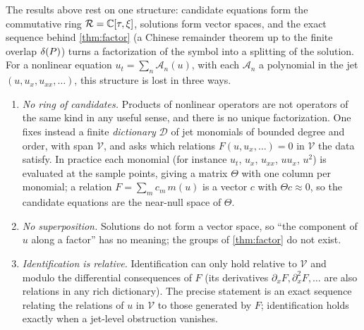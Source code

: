 The results above rest on one structure: candidate equations form the commutative ring
$\mathcal{R}=\mathbb{C}[\tau,\xi]$, solutions form vector spaces, and the exact sequence behind \cref{thm:factor} (a Chinese
remainder theorem up to the finite overlap $\delta(P)$) turns a
factorization of the symbol into a splitting of the solution. For a nonlinear equation
$u_t=\sum_n\mathcal A_n(u)$, with each $\mathcal A_n$ a polynomial in the jet $(u,u_x,u_{xx},\dots)$, this structure is lost
in three ways.
\begin{enumerate}[label=(\roman*)]
  \item \emph{No ring of candidates.} Products of nonlinear operators are not operators of the same kind
  in any useful sense, and there is no unique factorization. One fixes instead a finite
  \emph{dictionary} $\mathcal D$ of jet monomials of bounded degree and order, with span $\mathcal V$, and asks
  which relations $F(u,u_x,\dots)=0$ in $\mathcal V$ the data satisfy. In practice each monomial (for instance
  $u_t$, $u_x$, $u_{xx}$, $uu_x$, $u^2$) is evaluated at the sample points, giving a matrix $\Theta$ with one column per
  monomial; a relation $F=\sum_mc_m\,m(u)$ is a vector $c$ with $\Theta c\approx0$, so the candidate equations are the
  near-null space of $\Theta$.
  \item \emph{No superposition.} Solutions do not form a vector space, so ``the component of $u$ along a
  factor'' has no meaning; the groups of \cref{thm:factor} do not exist.
  \item \emph{Identification is relative.} Identification can only hold relative to $\mathcal V$ and modulo the
  differential consequences of $F$ (its derivatives $\partial_xF,\partial_x^2F,\dots$ are also relations in
  any rich dictionary). The precise statement is an exact sequence relating the relations of $u$ in $\mathcal V$
  to those generated by $F$; identification holds exactly when a jet-level obstruction vanishes.
\end{enumerate}

